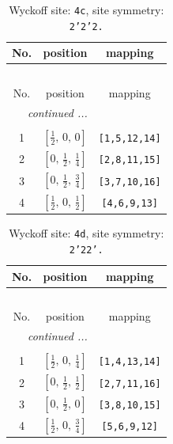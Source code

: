 \documentclass[fleqn,8pt]{jsarticle}
\begin{document}
\renewcommand{\arraystretch}{1.2}
\begin{longtable}{ccc}
\caption{Wyckoff site: {\tt 4c}, site symmetry: {\tt 2'2'2.}}
 \\
 \hline \hline
No. & position & mapping \\ \hline \endfirsthead

\multicolumn{2}{l}{\tablename\ \thetable{}} \\
 \hline \hline
No. & position & mapping \\ \hline \endhead

 \hline \hline
\multicolumn{2}{r}{\footnotesize\it continued ...} \\ \endfoot

 \hline \hline
\multicolumn{2}{r}{} \\ \endlastfoot

1 & $\left[ \frac{1}{2},\, 0,\, 0 \right]$ & {\tt [1,5,12,14]} \\ \hline
2 & $\left[ 0,\, \frac{1}{2},\, \frac{1}{4} \right]$ & {\tt [2,8,11,15]} \\ \hline
3 & $\left[ 0,\, \frac{1}{2},\, \frac{3}{4} \right]$ & {\tt [3,7,10,16]} \\ \hline
4 & $\left[ \frac{1}{2},\, 0,\, \frac{1}{2} \right]$ & {\tt [4,6,9,13]} \\
\end{longtable}
\renewcommand{\arraystretch}{1.2}
\begin{longtable}{ccc}
\caption{Wyckoff site: {\tt 4d}, site symmetry: {\tt 2'22'.}}
 \\
 \hline \hline
No. & position & mapping \\ \hline \endfirsthead

\multicolumn{2}{l}{\tablename\ \thetable{}} \\
 \hline \hline
No. & position & mapping \\ \hline \endhead

 \hline \hline
\multicolumn{2}{r}{\footnotesize\it continued ...} \\ \endfoot

 \hline \hline
\multicolumn{2}{r}{} \\ \endlastfoot

1 & $\left[ \frac{1}{2},\, 0,\, \frac{1}{4} \right]$ & {\tt [1,4,13,14]} \\ \hline
2 & $\left[ 0,\, \frac{1}{2},\, \frac{1}{2} \right]$ & {\tt [2,7,11,16]} \\ \hline
3 & $\left[ 0,\, \frac{1}{2},\, 0 \right]$ & {\tt [3,8,10,15]} \\ \hline
4 & $\left[ \frac{1}{2},\, 0,\, \frac{3}{4} \right]$ & {\tt [5,6,9,12]} \\
\end{longtable}
\end{document}
